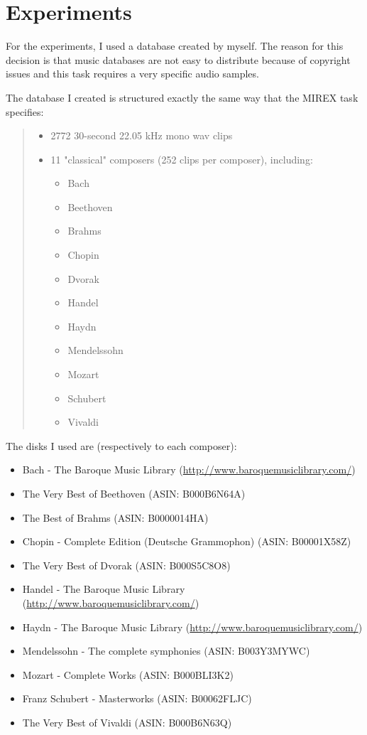 \documentclass[a4paper,openany,oneside,12pt]{book}
\begin{document}
\newpage
\thispagestyle{empty}
\mbox{}


\chapter{Experiments}\label{experiments}
For the experiments, I used a database created by myself. The reason for this decision is that music databases are not easy to distribute because of copyright issues and this task requires a very specific audio samples.

The database I created is structured exactly the same way that the MIREX task specifies:

\begin{quote}
\begin{itemize}
\item 2772 30-second 22.05 kHz mono wav clips
\item 11 "classical" composers (252 clips per composer), including:
	\begin{itemize}
	\item Bach
	\item Beethoven
	\item Brahms
	\item Chopin
	\item Dvorak
	\item Handel
	\item Haydn
	\item Mendelssohn
	\item Mozart
	\item Schubert
	\item Vivaldi 
	\end{itemize}
\end{itemize}
\end{quote}

The disks I used are (respectively to each composer):
\begin{itemize}
	\item Bach - The Baroque Music Library (\url{http://www.baroquemusiclibrary.com/})
	\item The Very Best of Beethoven (ASIN: B000B6N64A)
	\item The Best of Brahms (ASIN: B0000014HA)
	\item Chopin - Complete Edition (Deutsche Grammophon) (ASIN: B00001X58Z)
	\item The Very Best of Dvorak (ASIN: B000S5C8O8)
	\item Handel - The Baroque Music Library  (\url{http://www.baroquemusiclibrary.com/})
	\item Haydn - The Baroque Music Library (\url{http://www.baroquemusiclibrary.com/})
	\item Mendelssohn - The complete symphonies (ASIN: B003Y3MYWC)
	\item Mozart - Complete Works (ASIN: B000BLI3K2)
	\item Franz Schubert - Masterworks (ASIN: B00062FLJC)
	\item The Very Best of Vivaldi (ASIN: B000B6N63Q)
\end{itemize}
\end{document}
